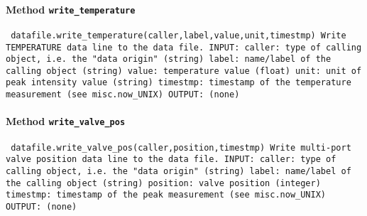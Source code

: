 \paragraph{Method \texttt{write_temperature}}
\vspace{1ex}
\texttt{\newline
datafile.write_temperature(caller,label,value,unit,timestmp)\newline
\newline
Write TEMPERATURE data line to the data file.\newline
\newline
INPUT:\newline
caller: type of calling object, i.e. the "data origin" (string)\newline
label: name/label of the calling object (string)\newline
value: temperature value (float)\newline
unit: unit of peak intensity value (string)\newline
timestmp: timestamp of the temperature measurement (see misc.now_UNIX)\newline
\newline
OUTPUT:\newline
(none)\newline
\newline
}

\paragraph{Method \texttt{write_valve_pos}}
\vspace{1ex}
\texttt{\newline
datafile.write_valve_pos(caller,position,timestmp)\newline
\newline
Write multi-port valve position data line to the data file.\newline
\newline
INPUT:\newline
caller: type of calling object, i.e. the "data origin" (string)\newline
label: name/label of the calling object (string)\newline
position: valve position (integer)\newline
timestmp: timestamp of the peak measurement (see misc.now_UNIX)\newline
\newline
OUTPUT:\newline
(none)\newline
\newline
}

